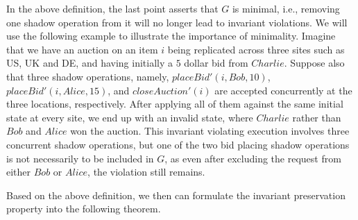In the above definition, the last point asserts that
$G$ is minimal, i.e., removing one shadow operation from it will no
longer lead to invariant violations. We will use the following example to illustrate
the importance of minimality. Imagine that we have an auction on an item $i$ 
being replicated across three sites such as US, UK and DE,
and having initially a $5$ dollar bid from $Charlie$. Suppose also that three shadow operations,
namely, $placeBid'(i, Bob, 10)$, $placeBid'(i, Alice, 15)$, and 
$closeAuction'(i)$ are accepted concurrently at the three locations, respectively. 
After applying all of them against the same initial state at every site,
we end up with an invalid state, where $Charlie$ rather than $Bob$ and $Alice$ won
the auction. This invariant violating execution
involves three concurrent shadow operations, but one of the two bid placing shadow
operations is not necessarily to be included in $G$, as even after excluding
the request from either $Bob$ or $Alice$, the violation still remains.   

Based on the above definition, we then can
 formulate the invariant preservation property into the following theorem.

